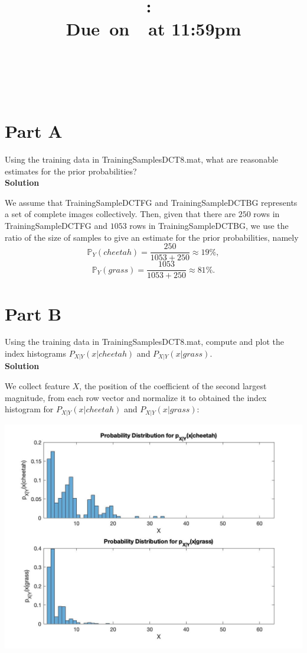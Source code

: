 \documentclass{article}
\title{
    \vspace{2in}
    \textmd{\textbf{\hmwkClass:\ \hmwkTitle}}\\
    \normalsize\vspace{0.1in}\small{Due\ on\ \hmwkDueDate\ at 11:59pm}\\
    \vspace{0.1in}\large{\textit{\hmwkClassInstructor}} \\
    \vspace{3in}
}
\author{
  \hmwkAuthorName \\
  \vspace{0.1in}\small\hmwkPID
}
\date{}
\newcommand*{\prob}{\mathds{P}}
\begin{document}
\maketitle

\pagebreak

\section*{Part A}
Using the training data in {\selectfont TrainingSamplesDCT\textunderscore8.mat}, what are reasonable estimates for the prior probabilities? \\

\textbf{\large Solution}

We assume that {\selectfont TrainingSampleDCT\textunderscore FG} and {\selectfont TrainingSampleDCT\textunderscore BG} represents a set of complete images collectively. Then, given that there are $250$ rows in {\selectfont TrainingSampleDCT\textunderscore FG} and $1053$ rows in {\selectfont TrainingSampleDCT\textunderscore BG}, we use the ratio of the size of samples to give an estimate for the prior probabilities, namely 
\[
  \prob_Y(cheetah) = \frac{250}{1053 + 250} \approx 19\%,
\]
\[
  \prob_Y(grass) = \frac{1053}{1053 + 250} \approx 81\%.
\]

\section*{Part B}
Using the training data in {\selectfont TrainingSamplesDCT\textunderscore8.mat}, compute and plot the index histograms $P_{X|Y}(x|cheetah)$ and $P_{X|Y}(x|grass)$. \\

\textbf{\large Solution}

We collect feature $X$, the position of the coefficient of the second largest magnitude, from each row vector and normalize it to obtained the index histogram for $P_{X|Y}(x|cheetah)$ and $P_{X|Y}(x|grass)$:
\begin{center}
  \includegraphics[scale=0.3]{probability_histogram}
\end{center}
\end{document}
